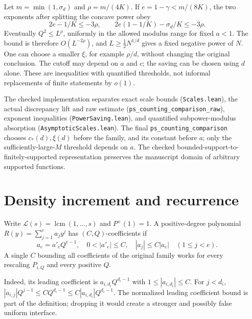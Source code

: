 Let $m=\min(1,\sigma_d)$ and $\rho=m/(4K)$. If $e=1-\gamma<m/(8K)$, the two exponents after splitting the concave power obey
\[
 2e-1/K\leq-3\rho,\qquad
 2e(1-1/K)-\sigma_d/K\leq-3\rho.
\]
Eventually $Q^2\leq L^\rho$, uniformly in the allowed modulus range for fixed $a<1$. The bound is therefore $O(L^{-2\rho})$, and $L\geq\frac12N^{1/d}$ gives a fixed negative power of $N$. One can choose a smaller $\xi$, for example $\rho/d$, without changing the original conclusion. The cutoff may depend on $a$ and $c$; the saving can be chosen using $d$ alone. These are inequalities with quantified thresholds, not informal replacements of finite statements by $o(1)$.

The checked implementation separates exact scale bounds (\texttt{Scales.lean}), the actual discrepancy lift and raw estimate (\texttt{ps\_\allowbreak{}counting\_\allowbreak{}comparison\_\allowbreak{}raw}), exponent inequalities (\texttt{PowerSaving.lean}), and quantified subpower-modulus absorption (\texttt{AsymptoticScales.lean}). The final \texttt{ps\_\allowbreak{}counting\_\allowbreak{}comparison} chooses $c_*(d),\xi(d)$ before the family, and its constant before $a$; only the sufficiently-large-$M$ threshold depends on $a$. The checked bounded-support-to-finitely-supported representation preserves the manuscript domain of arbitrary supported functions.
\fi

\section{Density increment and recurrence}
\begin{definition}\label{def:coefficients}
Write $\mathcal L(s)=\operatorname{lcm}(1,\ldots,s)$ and $P^+(1)=1$. A positive-degree polynomial $R(y)=\sum_{j=1}^e a_jy^j$ has $(C,Q)$-coefficients if
\[
 a_e=a'_eQ^{e-1},\quad0<|a'_e|\leq C,\quad
 |a_j|\leq C|a_e|\quad(1\leq j<e).
\]
A single $C$ bounding all coefficients of the original family works for every rescaling $P_{i,Q}$ and every positive $Q$.
\end{definition}
\ifDetailed
Indeed, its leading coefficient is $a_{i,d_i}Q^{d_i-1}$ with $1\leq|a_{i,d_i}|\leq C$. For $j<d_i$, $|a_{i,j}|Q^{j-1}\leq C Q^{d_i-1}\leq C|a_{i,d_i}|Q^{d_i-1}$. The normalized leading coefficient bound is part of the definition; dropping it would create a stronger and possibly false uniform interface.
\fi

